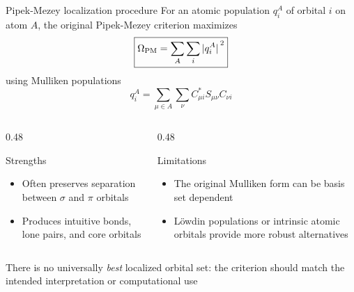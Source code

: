 \documentclass[aspectratio=169,9pt]{beamer}
\newcommand{\cmark}{\textbf{\green{\ding{51}}}}
\newcommand{\xmark}{\textbf{\red{\ding{55}}}}
\newcommand{\red}[1]{\textcolor{hfRed}{#1}}
\newcommand{\green}[1]{\textcolor{hfGreen}{#1}}
\begin{document}
\begin{frame}{Pipek-Mezey localization procedure}
	For an atomic population $q_{i}^{A}$ of orbital $i$ on atom $A$, the original Pipek-Mezey criterion maximizes
	\begin{equation*}
		\boxed{
			\Omega_\text{PM}
			=
			\sum_A \sum_i
			\abs*{q_{i}^{A}}^2
		}
	\end{equation*}
	using Mulliken populations
	\begin{equation*}
		q_{i}^{A}
		=
		\sum_{\mu\in A} \sum_{\nu}
		C_{\mu i}^* S_{\mu\nu} C_{\nu i}
	\end{equation*}

	\begin{columns}[T,onlytextwidth]
		\begin{column}{0.48\textwidth}
			\begin{block}{Strengths}
				\begin{itemize}
					\item[\cmark] Often preserves separation between $\sigma$ and $\pi$ orbitals
					\item[\cmark] Produces intuitive bonds, lone pairs, and core orbitals
				\end{itemize}
			\end{block}
		\end{column}
		\begin{column}{0.48\textwidth}
			\begin{block}{Limitations}
				\begin{itemize}
					\item[\xmark] The original Mulliken form can be basis set dependent
					\item[\xmark] L{\"o}wdin populations or intrinsic atomic orbitals provide more robust alternatives
				\end{itemize}
			\end{block}
		\end{column}
	\end{columns}
	\vfill
	\alert{There is no universally \emph{best} localized orbital set: the criterion
	should match the intended interpretation or computational use}
\end{frame}
\end{document}
